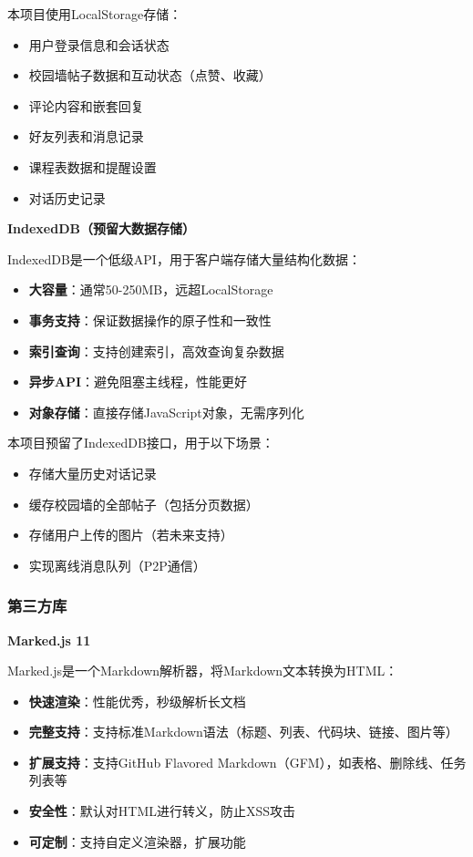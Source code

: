 \documentclass[12pt,a4paper]{article}
\begin{document}
本项目使用LocalStorage存储：

\begin{itemize}
    \item 用户登录信息和会话状态
    \item 校园墙帖子数据和互动状态（点赞、收藏）
    \item 评论内容和嵌套回复
    \item 好友列表和消息记录
    \item 课程表数据和提醒设置
    \item 对话历史记录
\end{itemize}

\textbf{IndexedDB（预留大数据存储）}

IndexedDB是一个低级API，用于客户端存储大量结构化数据：

\begin{itemize}
    \item \textbf{大容量}：通常50-250MB，远超LocalStorage
    \item \textbf{事务支持}：保证数据操作的原子性和一致性
    \item \textbf{索引查询}：支持创建索引，高效查询复杂数据
    \item \textbf{异步API}：避免阻塞主线程，性能更好
    \item \textbf{对象存储}：直接存储JavaScript对象，无需序列化
\end{itemize}

本项目预留了IndexedDB接口，用于以下场景：

\begin{itemize}
    \item 存储大量历史对话记录
    \item 缓存校园墙的全部帖子（包括分页数据）
    \item 存储用户上传的图片（若未来支持）
    \item 实现离线消息队列（P2P通信）
\end{itemize}

\subsubsection{第三方库}

\textbf{Marked.js 11}

Marked.js是一个Markdown解析器，将Markdown文本转换为HTML：

\begin{itemize}
    \item \textbf{快速渲染}：性能优秀，秒级解析长文档
    \item \textbf{完整支持}：支持标准Markdown语法（标题、列表、代码块、链接、图片等）
    \item \textbf{扩展支持}：支持GitHub Flavored Markdown（GFM），如表格、删除线、任务列表等
    \item \textbf{安全性}：默认对HTML进行转义，防止XSS攻击
    \item \textbf{可定制}：支持自定义渲染器，扩展功能
\end{itemize}
\end{document}
